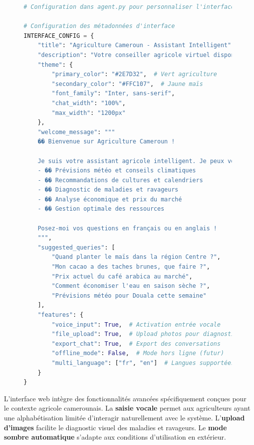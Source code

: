 \begin{figure}[H]
\centering
\begin{lstlisting}[language=Python, caption=Configuration de l'interface web ADK]
# Configuration dans agent.py pour personnaliser l'interface

# Configuration des métadonnées d'interface
INTERFACE_CONFIG = {
    "title": "Agriculture Cameroun - Assistant Intelligent",
    "description": "Votre conseiller agricole virtuel disponible 24/7",
    "theme": {
        "primary_color": "#2E7D32",  # Vert agriculture
        "secondary_color": "#FFC107",  # Jaune maïs
        "font_family": "Inter, sans-serif",
        "chat_width": "100%",
        "max_width": "1200px"
    },
    "welcome_message": """
    �� Bienvenue sur Agriculture Cameroun !

    Je suis votre assistant agricole intelligent. Je peux vous aider avec :
    - ��️ Prévisions météo et conseils climatiques
    - �� Recommandations de cultures et calendriers
    - �� Diagnostic de maladies et ravageurs
    - �� Analyse économique et prix du marché
    - �� Gestion optimale des ressources

    Posez-moi vos questions en français ou en anglais !
    """,
    "suggested_queries": [
        "Quand planter le maïs dans la région Centre ?",
        "Mon cacao a des taches brunes, que faire ?",
        "Prix actuel du café arabica au marché",
        "Comment économiser l'eau en saison sèche ?",
        "Prévisions météo pour Douala cette semaine"
    ],
    "features": {
        "voice_input": True,  # Activation entrée vocale
        "file_upload": True,  # Upload photos pour diagnostic
        "export_chat": True,  # Export des conversations
        "offline_mode": False,  # Mode hors ligne (futur)
        "multi_language": ["fr", "en"]  # Langues supportées
    }
}


\end{lstlisting}
\end{figure}

L'interface web intègre des fonctionnalités avancées spécifiquement conçues pour le contexte agricole camerounais. La \textbf{saisie vocale} permet aux agriculteurs ayant une alphabétisation limitée d'interagir naturellement avec le système. L'\textbf{upload d'images} facilite le diagnostic visuel des maladies et ravageurs. Le \textbf{mode sombre automatique} s'adapte aux conditions d'utilisation en extérieur.

